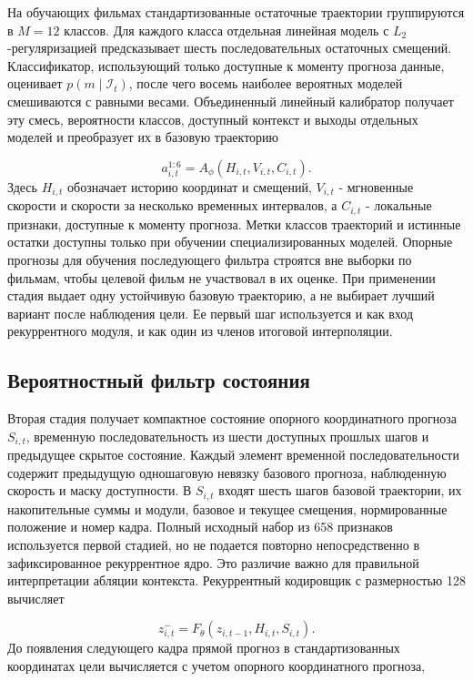 \documentclass[11pt,a4paper]{article}
\begin{document}
На обучающих фильмах стандартизованные остаточные траектории группируются в $M=12$ классов. Для каждого класса отдельная линейная модель с $L_2$-регуляризацией предсказывает шесть последовательных остаточных смещений. Классификатор, использующий только доступные к моменту прогноза данные, оценивает $p(m\mid\mathcal I_t)$, после чего восемь наиболее вероятных моделей смешиваются с равными весами. Объединенный линейный калибратор получает эту смесь, вероятности классов, доступный контекст и выходы отдельных моделей и преобразует их в базовую траекторию

\begin{equation}
a_{i,t}^{1:6}=A_\phi(H_{i,t},V_{i,t},C_{i,t}).
\end{equation}
Здесь $H_{i,t}$ обозначает историю координат и смещений, $V_{i,t}$ - мгновенные скорости и скорости за несколько временных интервалов, а $C_{i,t}$ - локальные признаки, доступные к моменту прогноза. Метки классов траекторий и истинные остатки доступны только при обучении специализированных моделей. Опорные прогнозы для обучения последующего фильтра строятся вне выборки по фильмам, чтобы целевой фильм не участвовал в их оценке. При применении стадия выдает одну устойчивую базовую траекторию, а не выбирает лучший вариант после наблюдения цели. Ее первый шаг используется и как вход рекуррентного модуля, и как один из членов итоговой интерполяции.

\subsection{Вероятностный фильтр состояния}
Вторая стадия получает компактное состояние опорного координатного прогноза $S_{i,t}$, временную последовательность из шести доступных прошлых шагов и предыдущее скрытое состояние. Каждый элемент временной последовательности содержит предыдущую одношаговую невязку базового прогноза, наблюденную скорость и маску доступности. В $S_{i,t}$ входят шесть шагов базовой траектории, их накопительные суммы и модули, базовое и текущее смещения, нормированные положение и номер кадра. Полный исходный набор из 658 признаков используется первой стадией, но не подается повторно непосредственно в зафиксированное рекуррентное ядро. Это различие важно для правильной интерпретации абляции контекста. Рекуррентный кодировщик с размерностью 128 вычисляет

\begin{equation}
z^-_{i,t}=F_\theta(z_{i,t-1},H_{i,t},S_{i,t}).
\end{equation}
До появления следующего кадра прямой прогноз в стандартизованных координатах цели вычисляется с учетом опорного координатного прогноза,
\end{document}
